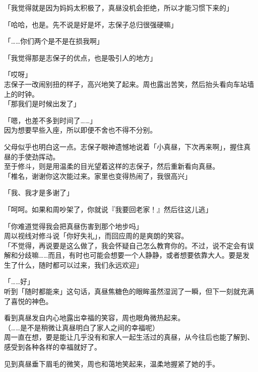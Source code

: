 「我觉得就是因为妈妈太积极了，真昼没机会拒绝，所以才能习惯下来的」

「哈哈，也是。先不说是好是坏，志保子总归很强硬嘛」

「……你们两个是不是在损我啊」

「我觉得那是志保子的优点，也是吸引人的地方」

「哎呀」\\

志保子一改闹别扭的样子，高兴地笑了起来。周也露出苦笑，然后抬头看向车站墙上的时钟。\\

「那我们是时候出发了」

「嗯，也差不多到时间了……」\\

因为想要早些入座，所以即便不舍也不得不分别。

父母似乎也明白这一点。志保子眼神遗憾地说着「小真昼，下次再来啊」，握住真昼的手使劲挥动。\\

至于修斗，则是用温柔的目光望着这样的志保子，然后重新看向真昼。\\

「椎名，谢谢你这次能过来。家里也变得热闹了，我很高兴」

「我、我才是多谢了」

「呵呵。如果和周吵架了，你就说『我要回老家！』然后往这儿逃」

「你难道觉得我会把真昼伤害到那个地步吗」\\

周以视线对修斗说「你好失礼」，而回应周的是爽朗的笑容。\\

「不觉得，再说要是这么做了，我会怀疑自己怎么教育你的。不过，说不定会有误解和分歧嘛……而且，有时也可能会想要一个人静静，或者想要依靠大人。要是发生了什么，随时都可以过来，我们永远欢迎」

「……好」\\

听到「随时都能来」这句话，真昼焦糖色的眼眸虽然湿润了一瞬，但下一刻就充满了喜悦的神色。

看到真昼发自内心地露出幸福的笑容，周也眼角微热起来。\\

（……是不是稍微让真昼明白了家人之间的幸福呢）\\

周一直在想，要是能让几乎没有和家人一起生活过的真昼，从今往后也能了解到、感受到各种各样的幸福就好了。

见到真昼垂下眉毛的微笑，周也和蔼地笑起来，温柔地握紧了她的手。
